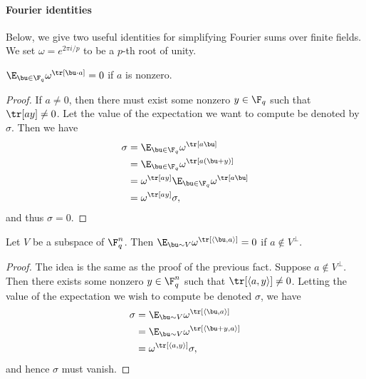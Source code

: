 \documentclass[11pt]{article}
\begin{document}
\paragraph{Fourier identities}
Below, we give two useful identities for simplifying Fourier sums over
finite fields. We set $\omega = e^{2\pi i / p}$ to be a $p$-th root of unity.

\begin{fact}\label{fact:averages-to-zero}
$\E_{\bu \in \F_q} \omega^{\tr[\bu \cdot a]} = 0$ if $a$ is nonzero.
\end{fact}
\begin{proof}
  If $a \neq 0$, then there must exist some nonzero $y \in \F_q$ such that
  $\tr[ay] \neq 0$. Let the value of the expectation we want to compute be
  denoted by $\sigma$. Then we have
  \begin{align*}
    \sigma &= \E_{\bu \in \F_q} \omega^{\tr[a \bu]} \\
           &= \E_{\bu \in \F_q} \omega^{\tr[a(\bu + y)]} \\
           &= \omega^{\tr[ay]} \E_{\bu \in \F_q}\omega^{\tr[a\bu]} \\
           &= \omega^{\tr[ay]} \sigma,
  \end{align*}
    and thus $\sigma = 0$.
  \end{proof}

  \begin{fact}\label{fact:averages-to-zero-subspace}
    Let $V$ be a subspace of $\F_q^n$. Then $\E_{\bu \sim V}
    \omega^{\tr[\langle \bu, a \rangle]} = 0$ if $a \notin V^\perp$.
  \end{fact}
  \begin{proof}
    The idea is the same as the proof of the previous fact. Suppose $a
    \notin V^\perp$. Then there exists some nonzero $y \in \F_q^n$
    such that $\tr[\langle a, y \rangle] \neq 0$. Letting the value of
    the expectation we wish to compute be denoted $\sigma$, we have
    \begin{align*}
      \sigma &= \E_{\bu \sim V} \omega^{\tr[\langle \bu, a \rangle]}
      \\
             &= \E_{\bu \sim V} \omega^{\tr[ \langle \bu + y,
               a\rangle]} \\
             &= \omega^{\tr[\langle a, y\rangle]} \sigma,
    \end{align*}
    and hence $\sigma $ must vanish.
  \end{proof}
  
\end{document}
